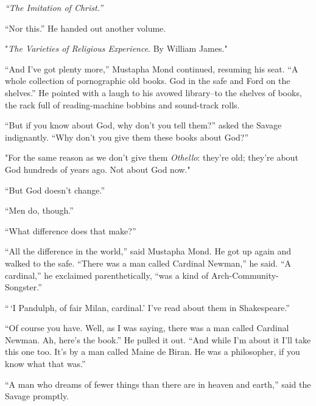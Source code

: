 \documentclass[12pt]{report}
\begin{document}
\emph{``The Imitation of Christ.''}

``Nor this.'' He handed out another volume.

"\emph{The Varieties of Religious Experience}. By William James."

``And I've got plenty more,'' Mustapha Mond continued, resuming his
seat. ``A whole collection of pornographic old books. God in the safe
and Ford on the shelves.'' He pointed with a laugh to his avowed
library--to the shelves of books, the rack full of reading-machine
bobbins and sound-track rolls.

``But if you know about God, why don't you tell them?'' asked the Savage
indignantly. ``Why don't you give them these books about God?''

"For the same reason as we don't give them \emph{Othello}: they're old;
they're about God hundreds of years ago. Not about God now."

``But God doesn't change.''

``Men do, though.''

``What difference does that make?''

``All the difference in the world,'' said Mustapha Mond. He got up again
and walked to the safe. ``There was a man called Cardinal Newman,'' he
said. ``A cardinal,'' he exclaimed parenthetically, ``was a kind of
Arch-Community-Songster.''

``\,`I Pandulph, of fair Milan, cardinal.' I've read about them in
Shakespeare.''

``Of course you have. Well, as I was saying, there was a man called
Cardinal Newman. Ah, here's the book.'' He pulled it out. ``And while
I'm about it I'll take this one too. It's by a man called Maine de
Biran. He was a philosopher, if you know what that was.''

``A man who dreams of fewer things than there are in heaven and earth,''
said the Savage promptly.
\end{document}

